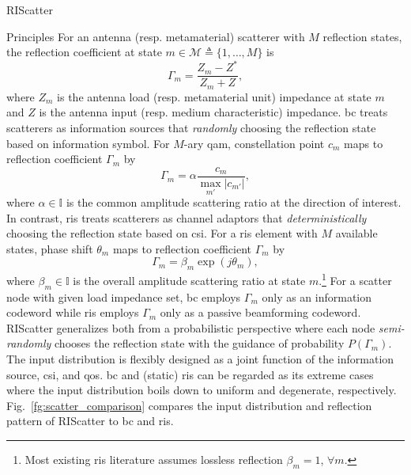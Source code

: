 \documentclass[journal]{IEEEtran}
\begin{document}
\begin{section}{RIScatter}
\begin{subsection}{Principles}
		For an antenna (resp. metamaterial) scatterer with $M$ reflection states, the reflection coefficient at state $m \in \mathcal{M} \triangleq \{1,\ldots,M\}$ is
		\begin{equation}
			\Gamma_m = \frac{Z_m - Z^*}{Z_m + Z},
			\label{eq:reflection_coefficient}
		\end{equation}
		where $Z_m$ is the antenna load (resp. metamaterial unit) impedance at state $m$ and $Z$ is the antenna input (resp. medium characteristic) impedance.
		\gls{bc} treats scatterers as information sources that \emph{randomly} choosing the reflection state based on information symbol.
		For $M$-ary \gls{qam}, constellation point $c_m$ maps to reflection coefficient $\Gamma_m$ by \cite{Thomas2012a}
		\begin{equation}
			\Gamma_m = \alpha \frac{c_m}{\max_{m'} \lvert c_{m'} \rvert},
			\label{eq:backscatter_modulation}
		\end{equation}
		where $\alpha \in \mathbb{I}$ is the common amplitude scattering ratio at the direction of interest.
		In contrast, \gls{ris} treats scatterers as channel adaptors that \emph{deterministically} choosing the reflection state based on \gls{csi}.
		For a \gls{ris} element with $M$ available states, phase shift $\theta_m$ maps to reflection coefficient $\Gamma_m$ by \cite{Wu2018}
		\begin{equation}
			\Gamma_m = \beta_m \exp(j \theta_m),
			\label{eq:passive_beamforming}
		\end{equation}
		where $\beta_m \in \mathbb{I}$ is the overall amplitude scattering ratio at state $m$.\footnote{Most existing \gls{ris} literature assumes lossless reflection $\beta_m=1$, $\forall m$.}
		For a scatter node with given load impedance set, \gls{bc} employs $\Gamma_m$ only as an information codeword while \gls{ris} employs $\Gamma_m$ only as a passive beamforming codeword.
		RIScatter generalizes both from a probabilistic perspective where each node \emph{semi-randomly} chooses the reflection state with the guidance of probability $P(\Gamma_m)$.
		The input distribution is flexibly designed as a joint function of the information source, \gls{csi}, and \gls{qos}.
		\gls{bc} and (static) \gls{ris} can be regarded as its extreme cases where the input distribution boils down to uniform and degenerate, respectively.
		Fig.~\ref{fg:scatter_comparison} compares the input distribution and reflection pattern of RIScatter to \gls{bc} and \gls{ris}.
		\begin{figure}[!t]

\end{figure}
\end{subsection}
\end{section}
\end{document}
